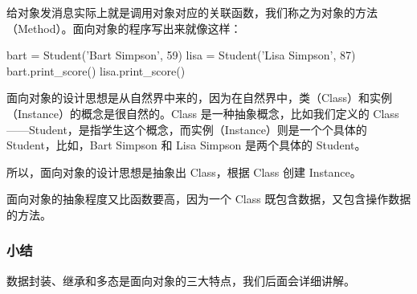 给对象发消息实际上就是调用对象对应的关联函数，我们称之为对象的方法（Method）。面向对象的程序写出来就像这样：

\begin{pythoncode}
bart = Student('Bart Simpson', 59)
lisa = Student('Lisa Simpson', 87)
bart.print_score()
lisa.print_score()
\end{pythoncode}

面向对象的设计思想是从自然界中来的，因为在自然界中，类（Class）和实例（Instance）的概念是很自然的。Class
是一种抽象概念，比如我们定义的
Class------Student，是指学生这个概念，而实例（Instance）则是一个个具体的
Student，比如，Bart Simpson 和 Lisa Simpson 是两个具体的 Student。

所以，面向对象的设计思想是抽象出 Class，根据 Class 创建 Instance。

面向对象的抽象程度又比函数要高，因为一个 Class
既包含数据，又包含操作数据的方法。

\hypertarget{ux5c0fux7ed3}{%
\subsubsection{小结}\label{ux5c0fux7ed3}}

数据封装、继承和多态是面向对象的三大特点，我们后面会详细讲解。

